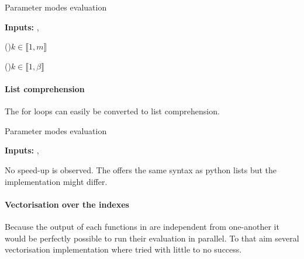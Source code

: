 {}
\SetEndCharOfAlgoLine{}
\begin{algorithm}[hbtp!]
	\caption{Parameter modes evaluation}\label{alg:two}
	\textbf{Inputs: } ,  \textcolor{GreenLMS}{}
	
	\For(\textcolor{GreenLMS}{}){$k \in \llbracket 1,m \rrbracket$}{

	\For(\textcolor{GreenLMS}{}){$k \in \llbracket 1,\beta \rrbracket$}{
    }
    }
\end{algorithm}

\paragraph{List comprehension}

The for loops can easily be converted to list comprehension.

\begin{algorithm}[hbtp!]
	\caption{Parameter modes evaluation}\label{alg:two}
	\textbf{Inputs: } ,  \textcolor{GreenLMS}{}
	
\code{Para\_mode\_Lists = [[self.Para\_modes[mode][p](mu[p])} 
\code{for p in range(self.n\_para)]for mode in range(self.n\_modes)]}
\end{algorithm}

No speed-up is observed. The  offers the same syntax as python lists but the implementation might differ.

\paragraph{Vectorisation over the indexes} Because the output of each functions in  are independent from one-another it would be perfectly possible to run their evaluation in parallel. To that aim several vectorisation implementation where tried with little to no success.

